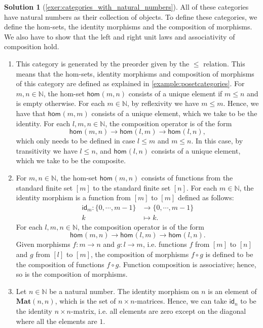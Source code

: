 \documentclass[a4paper,11pt, oneside,titlepage=false]{scrbook}
\theoremstyle{plain}
\theoremstyle{definition}
\newtheorem{solution}[thm]{Solution}
\newcommand{\cfont}[1]{\ensuremath{\mathsf{#1}}}
\newcommand{\Catb}[1]{\mathbf{#1}}
\newcommand{\MAT}{\Catb{Mat}}
\newcommand{\Hom}[3][]{\cfont{hom}_{#1}(#2,#3)}
\newcommand{\CHom}[3]{{#1}(#2,#3)}
\newcommand{\Id}[1][]{\cfont{id}_{#1}}
\newcommand{\co}[2]{\ensuremath{#2 \circ #1}}
\newcommand{\NN}{\ensuremath{\mathbb{N}}}
\begin{document}
\begin{solution}[\cref{exer:categories_with_natural_numbers}]
\label{sol:categories_with_natural_numbers}
All of these categories have natural numbers as their collection of objects. To define these categories, we define the hom-sets, the identity morphisms and the composition of morphisms. We also have to show that the left and right unit laws and associativity of composition hold.
\begin{enumerate}
\item This category is generated by the preorder given by the $\leq$ relation. This means that the hom-sets, identity morphisms and composition of morphisms of this category are defined as explained in \cref{example:posetcategories}.
For $m,n \in \NN$, the hom-set $\Hom m n$ consists of a unique element if $m \leq n$ and is empty otherwise. For each $m \in \NN$, by reflexivity we have $m \leq m$. Hence, we have that $\Hom m m$ consists of a unique element, which we take to be the identity.
For each $l, m, n\in \NN$, the composition operator is of the form
\[
\Hom m n \to \Hom l m \to \Hom l n,
\]
which only needs to be defined in case $l \leq m$ and $m \leq n$. In this case, by transitivity we have $l \leq n$, and $\Hom l n$ consists of a unique element, which we take to be the composite.
\item For $m,n \in \NN$, the hom-set $\Hom m n$ consists of functions from the standard finite set $[m]$ to the standard finite set $[n]$.
For each $m \in \NN$, the identity morphism is a function from $[m]$ to $[m]$ defined as follows:
\begin{align*}
	\Id[m] :  \{0, \cdots , m-1\} & \to \{0, \cdots , m-1\} \\
	k & \mapsto k.
\end{align*}
For each $l, m, n\in \NN$, the composition operator is of the form
\[
\Hom m n \to \Hom l m \to \Hom l n.
\]
Given morphisms $f : m \to n$ and $g : l \to m $, i.e. functions $f$ from $[m]$ to $[n]$ and $g$ from $[l]$ to $[m]$, the composition of morphisms $\co{g}{f}$ is defined to be the composition of functions $\co{g}{f}$.
Function composition is associative; hence, so is the composition of morphisms.
\item Let $n\in \NN$ be a natural number. The identity morphism on $n$ is an element of $\CHom{\MAT}{n}{n}$, which is the set of $n\times n$-matrices.
Hence, we can take $\Id[n]$ to be the identity $n\times n$-matrix, i.e. all elements are zero except on the diagonal where all the elements are $1$.


\end{enumerate}
\end{solution}
\end{document}
